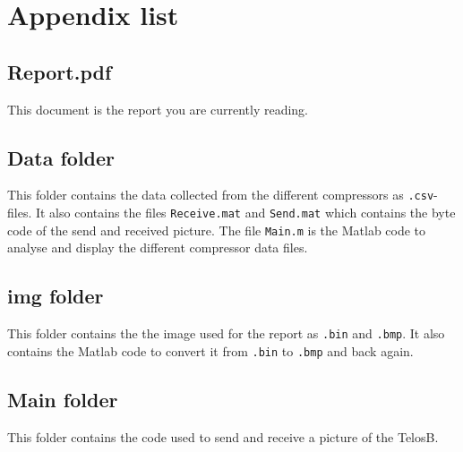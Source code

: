 
\section{Appendix list}

\subsection{Report.pdf}
This document is the report you are currently reading.

\subsection{Data folder}
This folder contains the data collected from the different compressors as \texttt{.csv}-files.
It also contains the files \texttt{Receive.mat} and \texttt{Send.mat} which contains the byte code of the send and received picture.
The file \texttt{Main.m} is the Matlab code to analyse and display the different compressor data files.

\subsection{img folder}
This folder contains the the image used for the report as \texttt{.bin} and \texttt{.bmp}. 
It also contains the Matlab code to convert it from \texttt{.bin} to \texttt{.bmp} and back again.

\subsection{Main folder}
This folder contains the code used to send and receive a picture of the TelosB.